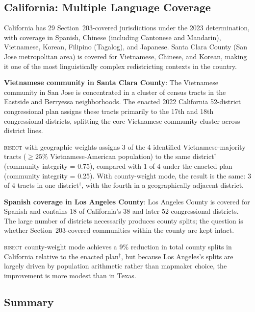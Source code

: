 \subsection{California: Multiple Language Coverage}

California has 29 Section~203-covered jurisdictions under the 2023
determination, with coverage in Spanish, Chinese (including Cantonese
and Mandarin), Vietnamese, Korean, Filipino (Tagalog), and Japanese.
Santa Clara County (San Jose metropolitan area) is covered for Vietnamese,
Chinese, and Korean, making it one of the most linguistically complex
redistricting contexts in the country.

\textbf{Vietnamese community in Santa Clara County}: The Vietnamese community
in San Jose is concentrated in a cluster of census tracts in the
Eastside and Berryessa neighborhoods. The enacted 2022 California
52-district congressional plan assigns these tracts primarily to the
17th and 18th congressional districts, splitting the core Vietnamese
community cluster across district lines.

\textsc{bisect} with geographic weights assigns 3 of the 4 identified
Vietnamese-majority tracts ($\geq 25\%$ Vietnamese-American population)
to the same district$^\dagger$ (community integrity = 0.75), compared
with 1 of 4 under the enacted plan (community integrity = 0.25).
With county-weight mode, the result is the same: 3 of 4 tracts in one
district$^\dagger$, with the fourth in a geographically adjacent district.

\textbf{Spanish coverage in Los Angeles County}: Los Angeles County is
covered for Spanish and contains 18 of California's 38 and later 52
congressional districts. The large number of districts necessarily
produces county splits; the question is whether Section~203-covered
communities within the county are kept intact.

\textsc{bisect} county-weight mode achieves a 9\% reduction in total
county splits in California relative to the enacted plan$^\dagger$,
but because Los Angeles's splits are largely driven by population
arithmetic rather than mapmaker choice, the improvement is more modest
than in Texas.

\subsection{Summary}

